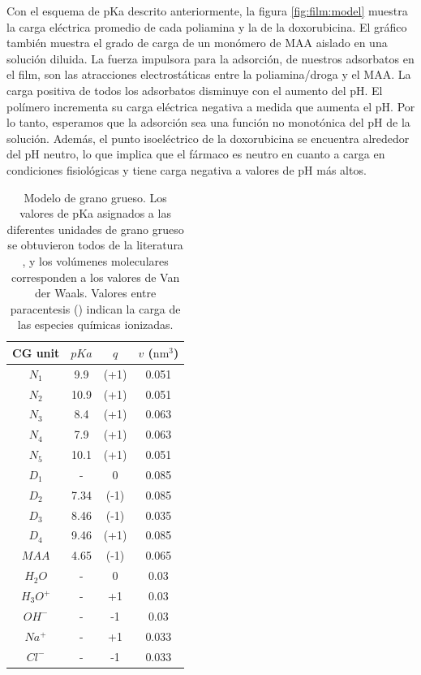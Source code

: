 Con el esquema de pKa descrito anteriormente, la figura \ref{fig:film:model} muestra la carga el\'ectrica promedio de cada poliamina y la de la doxorubicina. El gr\'afico tambi\'en muestra el grado de carga de un mon\'omero de MAA aislado en una soluci\'on diluida. La fuerza impulsora para la adsorci\'on, de nuestros adsorbatos en el film,  son las atracciones electrost\'aticas entre la poliamina/droga y el MAA. La carga positiva de todos los adsorbatos disminuye con el aumento del pH. El pol\'imero incrementa su carga el\'ectrica negativa  a medida que aumenta el pH. Por lo tanto, esperamos que la adsorci\'on sea una funci\'on no monot\'onica del pH de la soluci\'on. Adem\'as, el punto isoel\'ectrico de la doxorubicina se encuentra alrededor del pH neutro, lo que implica que el f\'armaco es neutro en cuanto a carga en condiciones fisiol\'ogicas y tiene carga negativa a valores de pH m\'as altos.



\begin{table}[!ht]
	\begin{centering}
		\centering
		\setlength{\tabcolsep}{2.2pt}
		\begin{tabular}{|cccc|}
			\hline 
			\hspace{0pt}CG unit   & $pKa$ & $q$  & $v$ ($\text{nm}^3$)  \\ \hline
			$N_1$& 9.9 & (+1) &0.051\\
			$N_2$& 10.9& (+1) & 0.051\\ 
		     $N_3$& 8.4& (+1)& 0.063\\
		     $N_4$&7.9& (+1) & 0.063\\
		     $N_5$& 10.1& (+1)& 0.051\\
		      $D_1$&  - & 0 &0.085\\
		     $D_2$& 7.34 & (-1) & 0.085\\ 
			 $D_3$&  8.46& (-1)& 0.035\\
			$D_4$&  9.46 & (+1) &0.085\\ 
			$MAA$&  4.65 & (-1) & 0.065\\
			$H_2O$ & - & 0 & 0.03\\
			$H_3O^+$ & - & +1 & 0.03\\
			$OH^-$ & - & -1 & 0.03\\
			$Na^+$ & - & +1 & 0.033\\ 
			$Cl^-$ & - & -1 & 0.033\\ \hline
		\end{tabular}		
		\caption{Modelo de grano grueso. Los valores de pKa asignados a las diferentes unidades de grano grueso se obtuvieron todos de la literatura \cite{agostinelli2010polyamines,casero2009,puchem}, y los vol\'umenes moleculares corresponden a los valores de Van der Waals. Valores entre paracentesis () indican la carga de las especies qu\'imicas ionizadas.}
		\label{table:CG}
	\end{centering}
\end{table}

